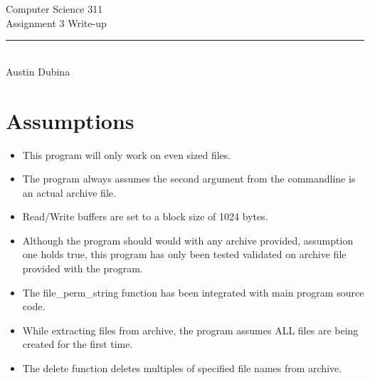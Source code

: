\documentclass[12pt,letterpaper]{article}
\begin{document}
\begin{titlepage}
    \vspace*{4cm}
    \begin{flushleft}
    {\huge
        Computer Science 311\\[.5cm]
    }
    {\large
        Assignment 3 Write-up
    }
    \end{flushleft}
    \vfill
    \rule{5in}{.5mm}\\
    Austin Dubina

\end{titlepage}

\section{Assumptions}
\begin{itemize}
\item This program will only work on even sized files.

\item The program always assumes the second argument from the commandline is an actual archive file.

\item Read/Write buffers are set to a block size of 1024 bytes.

\item Although the program should would with any archive provided, assumption one holds true, this program has only been tested validated on archive file provided with the program.

\item The file\_perm\_string function has been integrated with main program source code.

\item While extracting files from archive, the program assumes ALL files are being created for the first time.

\item The delete function deletes multiples of specified file names from archive.
\end{itemize}
\end{document}
